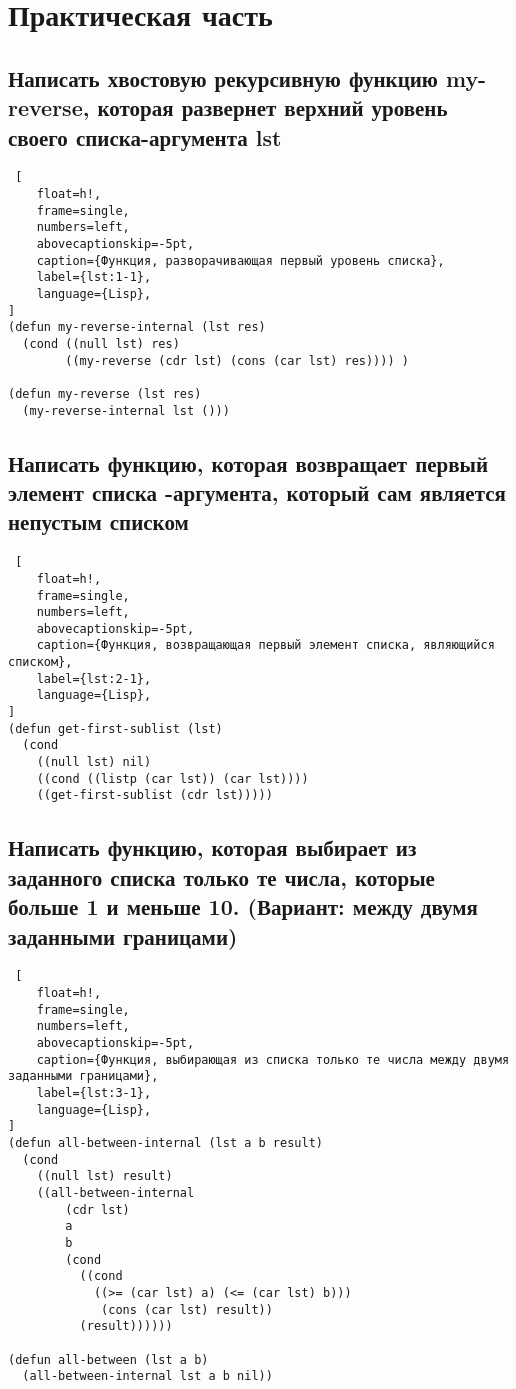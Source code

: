 \chapter{Практическая часть}

\section{Написать хвостовую рекурсивную функцию my-reverse, которая развернет верхний уровень своего списка-аргумента lst}

\begin{lstlisting} [
	float=h!,
	frame=single,
	numbers=left,
	abovecaptionskip=-5pt,
	caption={Функция, разворачивающая первый уровень списка},
	label={lst:1-1},
	language={Lisp},
]
(defun my-reverse-internal (lst res)
  (cond ((null lst) res)
        ((my-reverse (cdr lst) (cons (car lst) res)))) )

(defun my-reverse (lst res)
  (my-reverse-internal lst ()))
\end{lstlisting}

\section{Написать функцию, которая возвращает первый элемент списка -аргумента, который сам является непустым списком}

\begin{lstlisting} [
	float=h!,
	frame=single,
	numbers=left,
	abovecaptionskip=-5pt,
	caption={Функция, возвращающая первый элемент списка, являющийся списком},
	label={lst:2-1},
	language={Lisp},
]
(defun get-first-sublist (lst)
  (cond
    ((null lst) nil)
    ((cond ((listp (car lst)) (car lst))))
    ((get-first-sublist (cdr lst)))))
\end{lstlisting}

\clearpage

\section{Написать функцию, которая выбирает из заданного списка только те числа, которые больше 1 и меньше 10. (Вариант: между двумя заданными границами)}

\begin{lstlisting} [
	float=h!,
	frame=single,
	numbers=left,
	abovecaptionskip=-5pt,
	caption={Функция, выбирающая из списка только те числа между двумя заданными границами},
	label={lst:3-1},
	language={Lisp},
]
(defun all-between-internal (lst a b result)
  (cond
    ((null lst) result)
    ((all-between-internal
        (cdr lst)
        a
        b
        (cond
          ((cond
            ((>= (car lst) a) (<= (car lst) b)))
             (cons (car lst) result))
          (result))))))

(defun all-between (lst a b)
  (all-between-internal lst a b nil))
\end{lstlisting}


